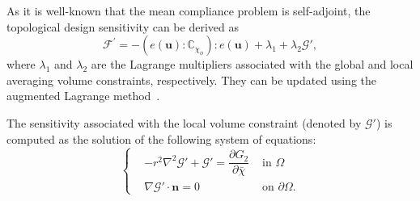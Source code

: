 \begin{subappendices}
As it is well-known that the mean compliance problem is self-adjoint, the topological design sensitivity can be derived as
\begin{equation}
	\mathcal{F}^{\prime}=-\left(e(\boldsymbol{u}): \mathbb{C}_{\chi_{\phi}}\right): e(\boldsymbol{u})+\lambda_{1} + \lambda_2 \mathcal{G}',
	\label{Eq: design sensitivity}
\end{equation}
where $\lambda_{1}$ and $\lambda_{2}$ are the Lagrange multipliers associated with the global and local averaging volume constraints, respectively. They can be updated using the augmented Lagrange method\ \cite{li2021full}.

The sensitivity associated with the local volume constraint (denoted by $\mathcal{G}'$) is computed as the solution of the following system of equations:
\begin{equation}
	\left\{\begin{aligned}	
		& -r^2 \nabla^2 \mathcal{G}' +  \mathcal{G}' =  \dfrac{\partial G_2}{\partial \bar{\chi}} & \text{ in } \Omega \\
		& \nabla\mathcal{G}' \cdot \boldsymbol{n} = 0 & \text{ on } \partial \Omega.
	\end{aligned}\right.
	\label{Eq: G'}
\end{equation}


\end{subappendices}




\cleardoublepage


